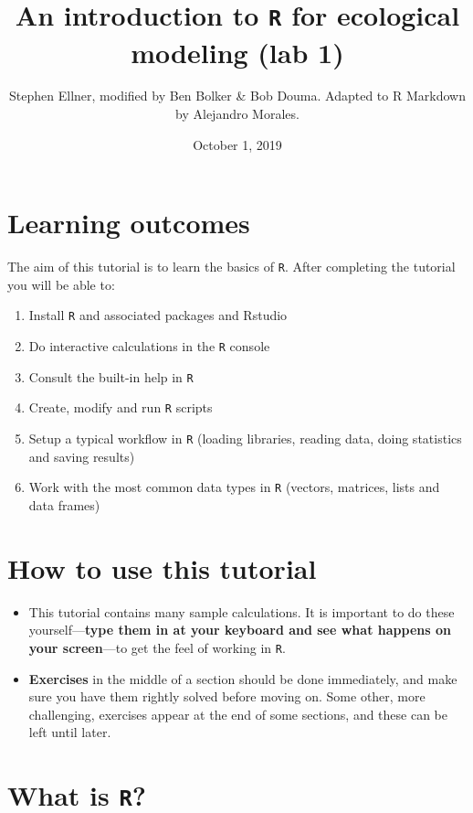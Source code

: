 \documentclass[11pt,]{article}
\title{An introduction to \texttt{R} for ecological modeling (lab 1)}
\author{Stephen Ellner, modified by Ben Bolker \& Bob Douma. Adapted to R Markdown by Alejandro Morales.}
\date{October 1, 2019}
\begin{document}
\maketitle

{
\setcounter{tocdepth}{2}
\tableofcontents
}
\hypertarget{learning-outcomes}{%
\section{Learning outcomes}\label{learning-outcomes}}

The aim of this tutorial is to learn the basics of \texttt{R}. After completing the tutorial you will be able to:

\begin{enumerate}
\def\labelenumi{\arabic{enumi}.}
\item
  Install \texttt{R} and associated packages and Rstudio
\item
  Do interactive calculations in the \texttt{R} console
\item
  Consult the built-in help in \texttt{R}
\item
  Create, modify and run \texttt{R} scripts
\item
  Setup a typical workflow in \texttt{R} (loading libraries, reading data, doing statistics and saving results)
\item
  Work with the most common data types in \texttt{R} (vectors, matrices, lists and data frames)
\end{enumerate}

\hypertarget{how-to-use-this-tutorial}{%
\section{How to use this tutorial}\label{how-to-use-this-tutorial}}

\begin{itemize}
\item
  This tutorial contains many sample calculations. It is important to do these yourself---\textbf{type them in at your keyboard and see what happens on your screen}---to get the feel of working in \texttt{R}.
\item
  \textbf{Exercises} in the middle of a section should be done immediately, and make sure you have them rightly solved before moving on. Some other, more challenging, exercises appear at the end of some sections, and these can be left until later.
\end{itemize}

\hypertarget{what-is-r}{%
\section{\texorpdfstring{What is \texttt{R}?}{What is R?}}\label{what-is-r}}
\end{document}
